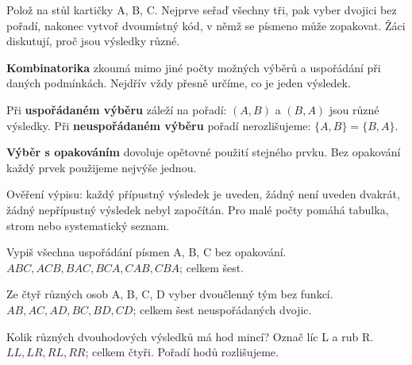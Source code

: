 \documentclass[11pt,a4paper]{article}
\begin{document}

Polož na stůl kartičky A, B, C. Nejprve seřaď všechny tři, pak vyber dvojici bez pořadí, nakonec vytvoř dvoumístný kód, v němž se písmeno může zopakovat. Žáci diskutují, proč jsou výsledky různé.



\begin{definiceBox}
\textbf{Kombinatorika} zkoumá mimo jiné počty možných výběrů a uspořádání při daných podmínkách. Nejdřív vždy přesně určíme, co je jeden výsledek.
\end{definiceBox}
\begin{definiceBox}
Při \textbf{uspořádaném výběru} záleží na pořadí: $(A,B)$ a $(B,A)$ jsou různé výsledky. Při \textbf{neuspořádaném výběru} pořadí nerozlišujeme: $\{A,B\}=\{B,A\}$.
\end{definiceBox}
\begin{definiceBox}
\textbf{Výběr s opakováním} dovoluje opětovné použití stejného prvku. Bez opakování každý prvek použijeme nejvýše jednou.
\end{definiceBox}
Ověření výpisu: každý přípustný výsledek je uveden, žádný není uveden dvakrát, žádný nepřípustný výsledek nebyl započítán. Pro malé počty pomáhá tabulka, strom nebo systematický seznam.


\begin{prikladReseniBox}[title={Příklad 1}]
Vypiš všechna uspořádání písmen A, B, C bez opakování.
\tcblower
$ABC,ACB,BAC,BCA,CAB,CBA$; celkem šest.
\end{prikladReseniBox}



\begin{prikladReseniBox}[title={Příklad 2}]
Ze čtyř různých osob A, B, C, D vyber dvoučlenný tým bez funkcí.
\tcblower
$AB,AC,AD,BC,BD,CD$; celkem šest neuspořádaných dvojic.
\end{prikladReseniBox}



\begin{prikladReseniBox}[title={Příklad 3}]
Kolik různých dvouhodových výsledků má hod mincí? Označ líc L a rub R.
\tcblower
$LL,LR,RL,RR$; celkem čtyři. Pořadí hodů rozlišujeme.
\end{prikladReseniBox}
\end{document}

